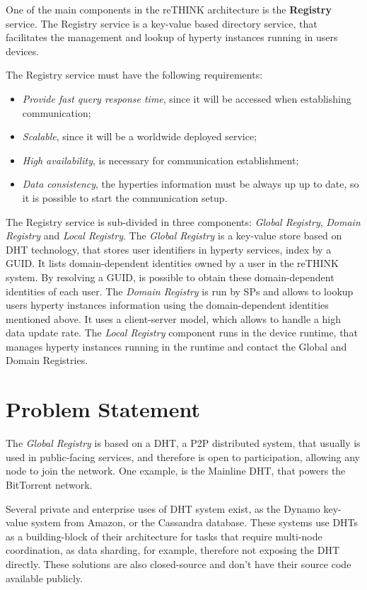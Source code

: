 One of the main components in the reTHINK architecture is the \textbf{Registry} service.
The Registry service is a key-value based directory service, that facilitates the management and lookup of hyperty instances running in users devices.

The Registry service must have the following requirements:
\begin{itemize}
	\item \textit{Provide fast query response time}, since it will be accessed when establishing communication;
	\item \textit{Scalable}, since it will be a worldwide deployed service;
	\item \textit{High availability}, is necessary for communication establishment;
	\item \textit{Data consistency}, the hyperties information must be always up up to date, so it is possible to start the communication setup.
\end{itemize}

The Registry service is sub-divided in three components: \textit{Global Registry}, \textit{Domain Registry} and \textit{Local Registry}.
The \textit{Global Registry} is a key-value store based on \ac{DHT} technology, that stores user identifiers in hyperty services, index by a \ac{GUID}.
It lists domain-dependent identities owned by a user in the reTHINK system.
By resolving a \ac{GUID}, is possible to obtain these domain-dependent identities of each user.
The \textit{Domain Registry} is run by \acp{SP} and allows to lookup users hyperty instances information using the domain-dependent identities mentioned above.
It uses a client-server model, which allows to handle a high data update rate.
The \textit{Local Registry} component runs in the device runtime, that manages hyperty instances running in the runtime and contact the Global and Domain Registries.

\section{Problem Statement}
\label{section:problem-statement}

The \textit{Global Registry} is based on a \ac{DHT}, a \ac{P2P} distributed system, that usually is used in public-facing services, and therefore is open to participation, allowing any node to join the network.
One example, is the Mainline \ac{DHT}, that powers the BitTorrent network.

Several private and enterprise uses of DHT system exist, as the Dynamo\cite{dynamo2007} key-value system from Amazon, or the Cassandra\cite{cassandra2010} database.
These systems use \acp{DHT} as a building-block of their architecture for tasks that require multi-node coordination, as data sharding, for example, therefore not exposing the \ac{DHT} directly.
These solutions are also closed-source and don't have their source code available publicly.

